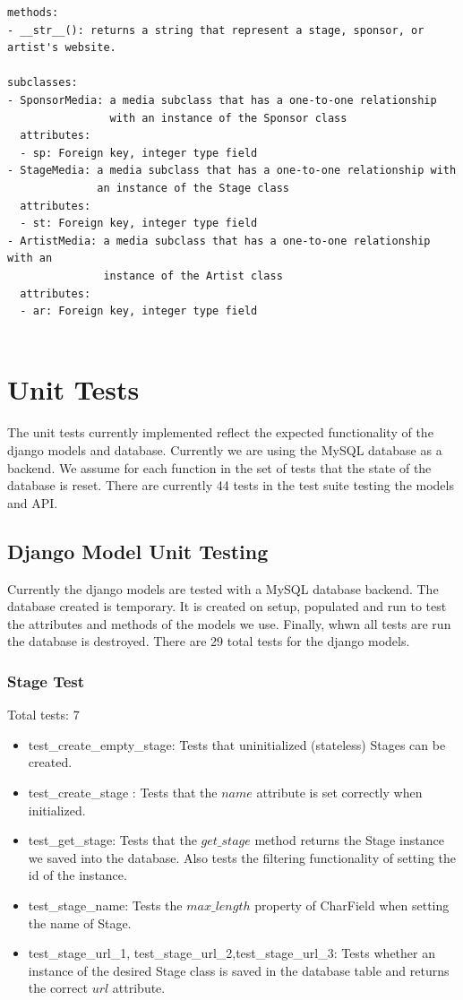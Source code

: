 \documentclass[12pt,english]{scrartcl}
\begin{document}
\begin{verbatim}
methods:
- __str__(): returns a string that represent a stage, sponsor, or artist's website.

subclasses:
- SponsorMedia: a media subclass that has a one-to-one relationship 
                with an instance of the Sponsor class
  attributes:
  - sp: Foreign key, integer type field
- StageMedia: a media subclass that has a one-to-one relationship with 
              an instance of the Stage class
  attributes:
  - st: Foreign key, integer type field
- ArtistMedia: a media subclass that has a one-to-one relationship with an
               instance of the Artist class
  attributes:
  - ar: Foreign key, integer type field
  
\end{verbatim}


\section{Unit Tests}

The unit tests currently implemented reflect the expected functionality of the django models and database.
Currently we are using the MySQL database as a backend. We assume for each function in the set of tests that the state of the database is reset.
There are currently 44 tests in the test suite testing the models and API.

\subsection{Django Model Unit Testing}
Currently the django models are tested with a MySQL database backend. The database created is temporary. It is created on setup, populated 
and run to test the attributes and methods of the models we use. Finally, whwn all tests are run the database is destroyed. There are 29 total tests
for the django models.

\subsubsection{Stage Test}
Total tests: 7
\begin{itemize}
\item test\_create\_empty\_stage: Tests that uninitialized (stateless) Stages can be created.

\item test\_create\_stage : Tests that the $name$ attribute is set correctly when initialized.
 
\item test\_get\_stage: Tests that the $get\_stage$ method returns the Stage instance we saved into the database. Also tests the filtering functionality of setting the id of the instance.

\item test\_stage\_name: Tests the $max\_length$ property of CharField when setting the name of Stage.

\item test\_stage\_url\_1, test\_stage\_url\_2,test\_stage\_url\_3: Tests whether an instance of the desired Stage class 
is saved in the database table and returns the correct $url$ attribute. 
\end{itemize} 
\end{document}
